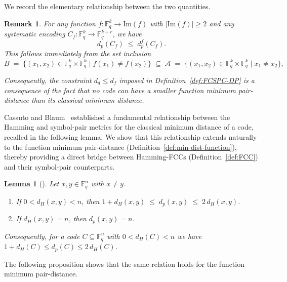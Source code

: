 \documentclass[11pt,draftclsnofoot,journal,onecolumn]{IEEEtran}
\newtheorem{lemma}{Lemma}
\newtheorem{remark}{Remark}
\begin{document}
    We record the elementary relationship between the two quantities.

    \begin{remark}
    \label{rem:dd-leq-df}
    For any function $f : \mathbb{F}_q^k \to \mathrm{Im}(f)$ with $|\mathrm{Im}(f)| \geq 2$ and any systematic encoding $C_f : \mathbb{F}_q^k \to \mathbb{F}_q^{k+r}$, we have
    \[
    d_p(C_f) \;\leq\; d_p^f(C_f).
    \]
    This follows immediately from the set inclusion
    \[
    B
    \;=\;
    \bigl\{(x_1,x_2)\in\mathbb{F}_q^k\times\mathbb{F}_q^k
    \mid f(x_1)\neq f(x_2)\bigr\}
    \;\subseteq\;
    \mathcal{A}
    \;=\;
    \bigl\{(x_1,x_2)\in\mathbb{F}_q^k\times\mathbb{F}_q^k
    \mid x_1\neq x_2\bigr\},
    \]

    Consequently, the constraint $d_d \leq d_f$ imposed in Definition~\ref{def:FCSPC-DP} is a consequence of the fact that no code can have a smaller function minimum pair-distance than its classical minimum distance.
    \end{remark}
    
    \noindent
    Cassuto and Blaum~\cite{cassuto2011codes} established a fundamental relationship between the Hamming and symbol-pair metrics for the classical minimum distance of a code, recalled in the following lemma. We show that this relationship extends naturally to the function minimum pair-distance (Definition~\ref{def:min-dist-function}), thereby providing a direct bridge between Hamming-FCCs (Definition~\ref{def:FCC}) and their symbol-pair counterparts.

    
 
    
    
    \begin{lemma}[\cite{cassuto2011codes}]
    \label{lem:hamming-pair-distance}
    Let $x, y \in \mathbb{F}_q^n$ with $x \neq y$.
    \begin{enumerate}
    \item If $0 < d_H(x,y) < n$, then
    $1 + d_H(x,y) \;\leq\; d_p(x,y) \;\leq\; 2\, d_H(x,y)$.
    \item If $d_H(x,y) = n$, then $d_p(x,y) = n$.
    \end{enumerate}
    Consequently, for a code $C \subseteq \mathbb{F}_q^n$ with $0 < d_H(C) < n$ we have
    $1 + d_H(C) \leq d_p(C) \leq 2\, d_H(C)$.
    \end{lemma}
    
    The following proposition shows that the same relation holds for the function minimum pair-distance.
    
\end{document}
